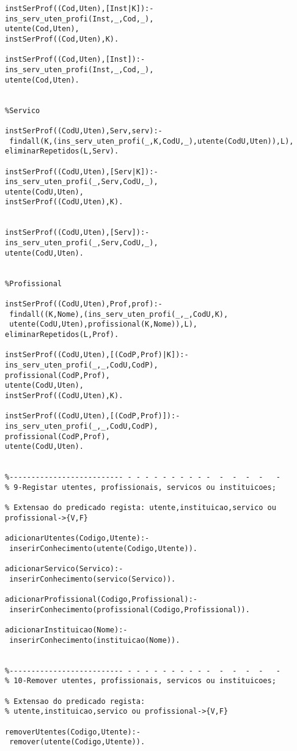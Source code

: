 \documentclass[pdftex,12pt,a4paper]{report}
\begin{document}
\begin{appendices}
\begin{Verbatim}
instSerProf((Cod,Uten),[Inst|K]):-
ins_serv_uten_profi(Inst,_,Cod,_),
utente(Cod,Uten),
instSerProf((Cod,Uten),K).

instSerProf((Cod,Uten),[Inst]):-
ins_serv_uten_profi(Inst,_,Cod,_),
utente(Cod,Uten).


%Servico

instSerProf((CodU,Uten),Serv,serv):-
 findall(K,(ins_serv_uten_profi(_,K,CodU,_),utente(CodU,Uten)),L),
eliminarRepetidos(L,Serv).

instSerProf((CodU,Uten),[Serv|K]):-
ins_serv_uten_profi(_,Serv,CodU,_),
utente(CodU,Uten),
instSerProf((CodU,Uten),K).


instSerProf((CodU,Uten),[Serv]):-
ins_serv_uten_profi(_,Serv,CodU,_),
utente(CodU,Uten).


%Profissional

instSerProf((CodU,Uten),Prof,prof):-
 findall((K,Nome),(ins_serv_uten_profi(_,_,CodU,K),
 utente(CodU,Uten),profissional(K,Nome)),L),
eliminarRepetidos(L,Prof).

instSerProf((CodU,Uten),[(CodP,Prof)|K]):-
ins_serv_uten_profi(_,_,CodU,CodP),
profissional(CodP,Prof),
utente(CodU,Uten),
instSerProf((CodU,Uten),K).

instSerProf((CodU,Uten),[(CodP,Prof)]):-
ins_serv_uten_profi(_,_,CodU,CodP),
profissional(CodP,Prof),
utente(CodU,Uten).


%-------------------------- - - - - - - - - - -  -  -  -  -   -         
% 9-Registar utentes, profissionais, servicos ou instituicoes;

% Extensao do predicado regista: utente,instituicao,servico ou profissional->{V,F}

adicionarUtentes(Codigo,Utente):-
 inserirConhecimento(utente(Codigo,Utente)).

adicionarServico(Servico):-
 inserirConhecimento(servico(Servico)).

adicionarProfissional(Codigo,Profissional):-
 inserirConhecimento(profissional(Codigo,Profissional)).

adicionarInstituicao(Nome):-
 inserirConhecimento(instituicao(Nome)).


%-------------------------- - - - - - - - - - -  -  -  -  -   -         
% 10-Remover utentes, profissionais, servicos ou instituicoes;

% Extensao do predicado regista:
% utente,instituicao,servico ou profissional->{V,F}

removerUtentes(Codigo,Utente):-
 remover(utente(Codigo,Utente)).


\end{Verbatim}
\end{appendices}
\end{document}
